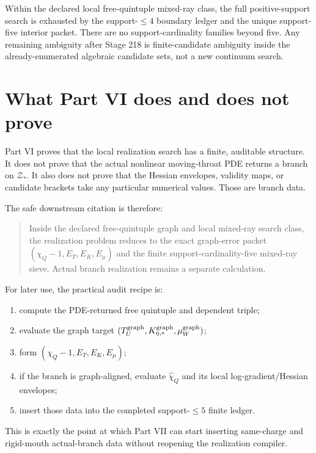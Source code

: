 \begin{theorem}
\label{thm:part06-final-local-mixed-ray-closure}
Within the declared local free-quintuple mixed-ray class, the full positive-support search is exhausted by the support-\(\le4\) boundary ledger and the unique support-five interior packet.  There are no support-cardinality families beyond five.  Any remaining ambiguity after Stage 218 is finite-candidate ambiguity inside the already-enumerated algebraic candidate sets, not a new continuum search.
\end{theorem}


\section{What Part VI does and does not prove}
\label{sec:part06-what-it-does-not-prove}

Part VI proves that the local realization search has a finite, auditable structure.  It does not prove that the actual nonlinear moving-throat PDE returns a branch on \(\mathcal Z_*\).  It also does not prove that the Hessian envelopes, validity maps, or candidate brackets take any particular numerical values.  Those are branch data.

The safe downstream citation is therefore:
\begin{quote}
Inside the declared free-quintuple graph and local mixed-ray search class, the realization problem reduces to the exact graph-error packet \((\chi_Q-1,E_T,E_K,E_\mu)\) and the finite support-cardinality-five mixed-ray sieve.  Actual branch realization remains a separate calculation.
\end{quote}

For later use, the practical audit recipe is:
\begin{enumerate}[leftmargin=2.2em]
  \item compute the PDE-returned free quintuple and dependent triple;
  \item evaluate the graph target \((T_U^{\rm graph},K_{\eta,*}^{\rm graph},\mu_W^{\rm graph})\);
  \item form \((\chi_Q-1,E_T,E_K,E_\mu)\);
  \item if the branch is graph-aligned, evaluate \(\widehat\chi_Q\) and its local log-gradient/Hessian envelopes;
  \item insert those data into the completed support-\(\le5\) finite ledger.
\end{enumerate}
This is exactly the point at which Part VII can start inserting same-charge and rigid-mouth actual-branch data without reopening the realization compiler.
